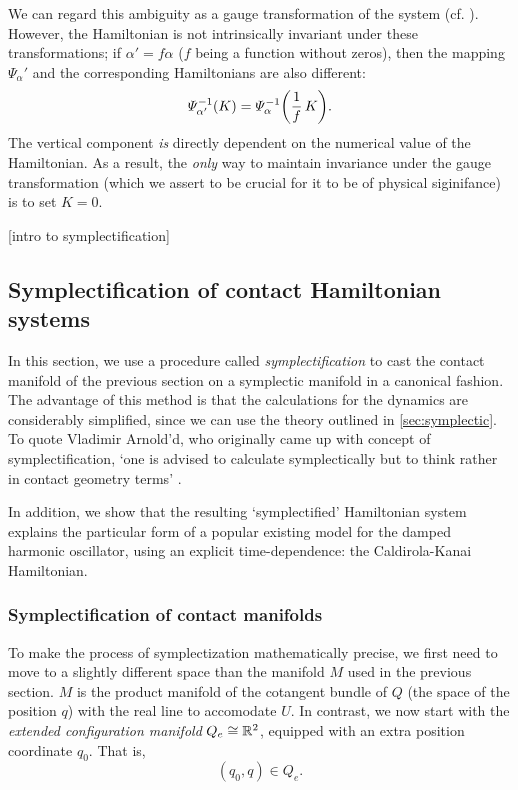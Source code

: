 We can regard this ambiguity as a gauge transformation of the system (cf. \citet{Balian2001}). However, the Hamiltonian is not intrinsically invariant under these transformations; if \( \alpha' = f \alpha \) (\(f\) being a function without zeros), then the mapping \(\Psi_\alpha'\) and the corresponding Hamiltonians are also different: \cite[p. 321]{Libermann1987} 
\begin{equation}
    \Psi^{-1}_{\alpha'}(K) = \Psi^{-1}_{\alpha}\qty(\frac{1}{f}\,K).
    \label{eq:contact_ham_scaling}
\end{equation}
The vertical component \emph{is} directly dependent on the numerical value of the Hamiltonian. As a result, the \emph{only} way to maintain invariance under the gauge transformation (which we assert to be crucial for it to be of physical siginifance) is to set \(K = 0\).

[intro to symplectification]

\subsection{Symplectification of contact Hamiltonian systems}
\label{ssec:symplectification}
In this section, we use a procedure called \emph{symplectification} to cast the contact manifold of the previous section on a symplectic manifold in a canonical fashion. The advantage of this method is that the calculations for the dynamics are considerably simplified, since we can use the theory outlined in \cref{sec:symplectic}. To quote Vladimir Arnold'd, who originally came up with concept of symplectification, `one is advised to calculate symplectically but to think rather in contact geometry terms’ \cite{VanderSchaft2021a,Arnold1989a}.

In addition, we show that the resulting `symplectified' Hamiltonian system explains the particular form of a popular existing model for the damped harmonic oscillator, using an explicit time-dependence: the Caldirola-Kanai Hamiltonian.

\subsubsection{Symplectification of contact manifolds}
To make the process of symplectization mathematically precise, we first need to move to a slightly different space than the manifold \(M\) used in the previous section. \(M\) is the product manifold of the cotangent bundle of \(Q\) (the space of the position \(q\)) with the real line to accomodate \(U\). In contrast, we now start with the \emph{extended configuration manifold} \(Q_e \cong \mathbb{R}^2\), equipped with an extra position coordinate \(q_0\). That is,
\begin{equation}
     (q_0, q) \in Q_e.
\end{equation}

